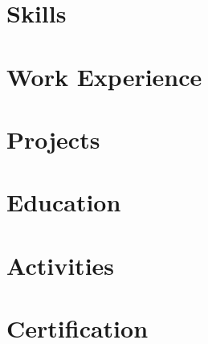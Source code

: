 \documentclass[a4paper,10pt]{article}
\begin{document}
\section{Skills}


\section{Work Experience}


\section{Projects}


\section{Education}


\section{Activities}


\section{Certification}
 
\end{document}
